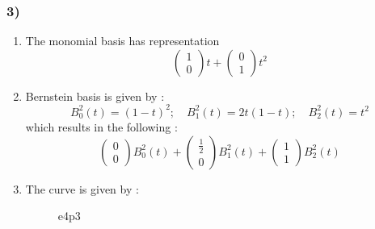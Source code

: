 \subsubsection{3)}
\begin{enumerate}
  \item The monomial basis has representation 
      \[
      \begin{pmatrix*}
          1  \\
          0  
      \end{pmatrix*}
      t + \begin{pmatrix*}
          0  \\
          1  
      \end{pmatrix*}
      t^2
      \]
  \item Bernstein basis is given by : 
      \[
          B _{ 0 }^{ 2 } (t) = \left( 1-t\right)^2; \quad B _{ 1 }^{ 2 } (t) = 2t\left( 1-t\right)
           ; \quad B _{ 2 }^{ 2 } (t) = t^2
      \]
      which results in the following : 
     \[
     \begin{pmatrix*}
         0  \\
         0  
     \end{pmatrix*}
     B _{ 0 }^{ 2 } (t) + 
     \begin{pmatrix*}
         \frac{ 1 }{ 2 }   \\
         0 
     \end{pmatrix*}
     B _{ 1 }^{ 2 } (t) + \begin{pmatrix*}
         1  \\
         1  
     \end{pmatrix*}
     B _{ 2 }^{ 2 } (t)
     \]
 \item The curve is given by :  
\begin{figure}[ht]
    \centering
    \caption{e4p3}
    \label{fig:e4p3}
\end{figure}
\end{enumerate}

